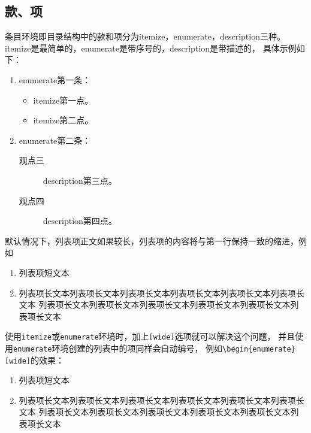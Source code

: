 \subsection{款、项}
\label{subsec-item}
条目环境即目录结构中的款和项分为itemize，enumerate，description三种。
itemize是最简单的，enumerate是带序号的，description是带描述的，
具体示例如下：

\begin{enumerate}
    \item enumerate第一条：
        \begin{itemize}
            \item itemize第一点。
            \item itemize第二点。
        \end{itemize}
    \item enumerate第二条：
        \begin{description}
            \item[观点三] description第三点。
            \item[观点四] description第四点。
        \end{description}
\end{enumerate}

默认情况下，列表项正文如果较长，列表项的内容将与第一行保持一致的缩进，例如

\begin{enumerate}
\item 列表项短文本
\item 列表项长文本列表项长文本列表项长文本列表项长文本列表项长文本列表项长文本
列表项长文本列表项长文本列表项长文本列表项长文本列表项长文本列表项长文本
\end{enumerate}

使用\verb|itemize|或\verb|enumerate|环境时，加上\verb|[wide]|选项就可以解决这个问题，
并且使用\verb|enumerate|环境创建的列表中的项同样会自动编号，
例如\verb|\begin{enumerate}[wide]|的效果：

\begin{enumerate}[wide]
\item 列表项短文本
\item 列表项长文本列表项长文本列表项长文本列表项长文本列表项长文本列表项长文本
列表项长文本列表项长文本列表项长文本列表项长文本列表项长文本列表项长文本
\end{enumerate}

